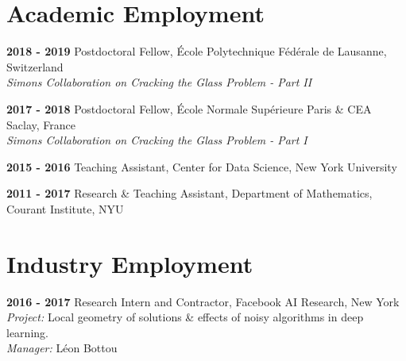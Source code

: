 \documentclass[10pt,letterpaper]{article}
\renewenvironment{itemize}
{
\begin{list}{}{\setlength{\leftmargin}{1.5em}}
}
{
  \end{list}
}
\begin{document}
\section*{Academic Employment}
\begin{itemize}
\item \textbf{2018 - 2019 } Postdoctoral Fellow, \'Ecole Polytechnique F\'ed\'erale de Lausanne, Switzerland \\ 
\hspace*{2cm} \textit{ Simons Collaboration on Cracking the Glass Problem - Part II}

\item \textbf{2017 - 2018 } Postdoctoral Fellow, \'Ecole Normale Sup\'erieure Paris \& CEA Saclay, France \\ 
\hspace*{2cm} \textit{ Simons Collaboration on Cracking the Glass Problem - Part I}

\item \textbf{2015 - 2016 } Teaching Assistant, Center for Data Science, New York University

\item \textbf{2011 - 2017 } Research \& Teaching Assistant, Department of Mathematics, Courant Institute, NYU
\end{itemize}

\section*{Industry Employment}
\begin{itemize}
\item \textbf{2016 - 2017 } Research Intern and Contractor, Facebook AI Research, New York \\ 
\hspace*{2cm} \textit{ Project: }{Local geometry of solutions \& effects of noisy algorithms in deep learning.} \\
\hspace*{2cm} \textit{ Manager: }{L\'eon Bottou}
\end{itemize}
\end{document}
